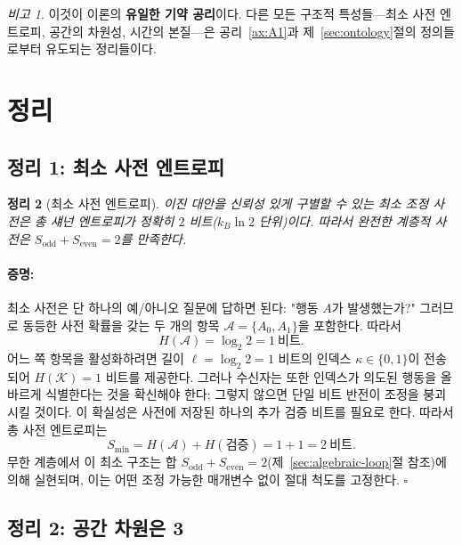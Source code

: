 \documentclass[12pt,a4paper]{article}
\newtheorem{theorem}{정리}[section]
\theoremstyle{remark}
\newtheorem{remark}[theorem]{비고}
\renewenvironment{proof}{\paragraph{증명:}}{\hfill$\square$}
\begin{document}
	\begin{remark}
		이것이 이론의 \textbf{유일한 기약 공리}이다. 다른 모든 구조적 특성들—최소 사전 엔트로피, 공간의 차원성, 시간의 본질—은 공리~\ref{ax:A1}과 제~\ref{sec:ontology}절의 정의들로부터 유도되는 정리들이다.
	\end{remark}
	
	\section{정리}
	\label{sec:theorems}
	
	\subsection{정리 1: 최소 사전 엔트로피}
	
	\begin{theorem}[최소 사전 엔트로피]
		\label{thm:minimal-dict}
		이진 대안을 신뢰성 있게 구별할 수 있는 최소 조정 사전은 총 섀넌 엔트로피가 정확히 \(2\) 비트(\(k_B\ln 2\) 단위)이다. 따라서 완전한 계층적 사전은 \(S_{\mathrm{odd}} + S_{\mathrm{even}} = 2\)를 만족한다.
	\end{theorem}
	
	\begin{proof}
		최소 사전은 단 하나의 예/아니오 질문에 답하면 된다: "행동 \(A\)가 발생했는가?" 그러므로 동등한 사전 확률을 갖는 두 개의 항목 \(\mathcal{A} = \{A_0, A_1\}\)을 포함한다. 따라서
		\[
		H(\mathcal{A}) = \log_2 2 = 1\ \text{비트}.
		\]
		어느 쪽 항목을 활성화하려면 길이 \(\ell = \log_2 2 = 1\) 비트의 인덱스 \(\kappa \in \{0,1\}\)이 전송되어 \(H(\mathcal{K}) = 1\) 비트를 제공한다. 그러나 수신자는 또한 인덱스가 의도된 행동을 올바르게 식별한다는 것을 확신해야 한다; 그렇지 않으면 단일 비트 반전이 조정을 붕괴시킬 것이다. 이 확실성은 사전에 저장된 하나의 추가 검증 비트를 필요로 한다. 따라서 총 사전 엔트로피는
		\[
		S_{\min} = H(\mathcal{A}) + H(\text{검증}) = 1 + 1 = 2\ \text{비트}.
		\]
		무한 계층에서 이 최소 구조는 합 \(S_{\mathrm{odd}} + S_{\mathrm{even}} = 2\)(제~\ref{sec:algebraic-loop}절 참조)에 의해 실현되며, 이는 어떤 조정 가능한 매개변수 없이 절대 척도를 고정한다.
	\end{proof}
	
	\subsection{정리 2: 공간 차원은 3}
	
\end{document}
